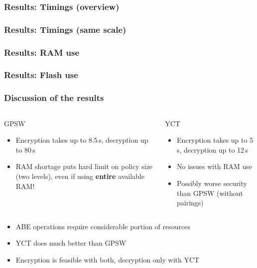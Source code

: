 \begin{frame}[c]
    \centering
    \frametitle{Results: Timings (overview)}
    \resizebox{!}{.35\textheight}{
        
    }
\end{frame}

\begin{frame}[c]
    \centering
    \frametitle{Results: Timings (same scale)}
    \resizebox{!}{.35\textheight}{
        
    }
\end{frame}

\begin{frame}[c]
    \frametitle{Results: RAM use}
    \centering
    
\end{frame}

\begin{frame}
    \frametitle{Results: Flash use}
    \centering
    
\end{frame}

\begin{frame}[t]
    \frametitle{Discussion of the results}
    \centering
    \vspace{1.5cm}
    \begin{columns}[t]
        \begin{block}{\centering GPSW}
            \begin{itemize}
                \item Encryption takes up to 8.5\,s, decryption up to 80\,s
                \item RAM shortage puts hard limit on policy size (two levels), even if using \textbf{entire} available RAM!
            \end{itemize}
        \end{block}
        \begin{block}{\centering YCT}
            \begin{itemize}
                \item Encryption takes up to 5\,s, decryption up to 12\,s
                \item No issues with RAM use
                \item Possibly worse security than GPSW (without pairings)
            \end{itemize}
        \end{block}
    \end{columns}
    \vspace{0.5cm}
    \begin{minipage}{.485\textwidth}
        \begin{itemize}
            \color{TUMOrange}
            [arrow]
            \item<2-> ABE operations require considerable portion of resources
            \item<3-> YCT does much better than GPSW
            \item<4-> Encryption is feasible with both, decryption only with YCT
        \end{itemize}
    \end{minipage}
\end{frame}

